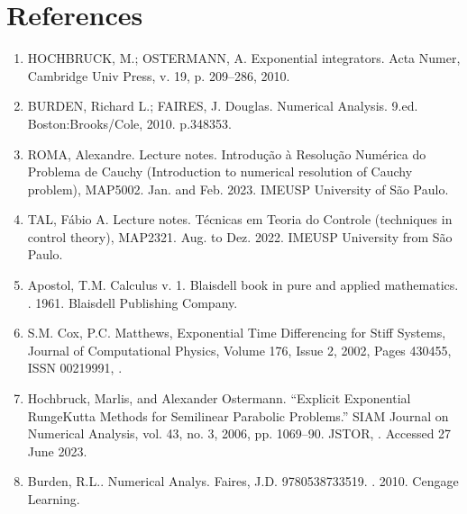 \documentclass[letterpaper,10pt,english]{jupyterBook}
\begin{document}
\chapter{References}
\label{\detokenize{References:references}}\label{\detokenize{References::doc}}\begin{enumerate}
%
\item {} 
\sphinxAtStartPar
HOCHBRUCK, M.; OSTERMANN, A. Exponential integrators. Acta Numer, Cambridge Univ Press, v. 19, p. 209–286, 2010.

\item {} 
\sphinxAtStartPar
BURDEN, Richard L.; FAIRES, J. Douglas. Numerical Analysis. 9.ed. Boston:Brooks/Cole, 2010. p.348\sphinxhyphen{}353.

\item {} 
\sphinxAtStartPar
ROMA, Alexandre. Lecture notes. Introdução à Resolução Numérica do Problema de Cauchy (Introduction to numerical resolution of Cauchy problem), MAP5002. Jan. and Feb. 2023. IME\sphinxhyphen{}USP University of São Paulo.

\item {} 
\sphinxAtStartPar
TAL, Fábio A. Lecture notes. Técnicas em Teoria do Controle (techniques in control theory), MAP2321. Aug. to Dez. 2022. IME\sphinxhyphen{}USP University from São Paulo.

\item {} 
\sphinxAtStartPar
Apostol, T.M. Calculus v. 1. Blaisdell book in pure and applied mathematics. . 1961. Blaisdell Publishing Company.

\item {} 
\sphinxAtStartPar
S.M. Cox, P.C. Matthews, Exponential Time Differencing for Stiff Systems, Journal of Computational Physics, Volume 176, Issue 2, 2002, Pages 430\sphinxhyphen{}455, ISSN 0021\sphinxhyphen{}9991, .

\item {} 
\sphinxAtStartPar
Hochbruck, Marlis, and Alexander Ostermann. “Explicit Exponential Runge\sphinxhyphen{}Kutta Methods for Semilinear Parabolic Problems.” SIAM Journal on Numerical Analysis, vol. 43, no. 3, 2006, pp. 1069–90. JSTOR, . Accessed 27 June 2023.

\item {} 
\sphinxAtStartPar
Burden, R.L.. Numerical Analys. Faires, J.D. 9780538733519. . 2010. Cengage Learning.

\end{enumerate}
\end{document}
